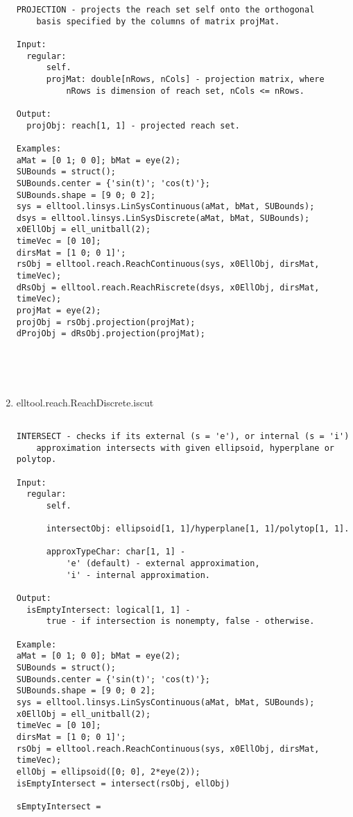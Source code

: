 \begin{enumerate}
\begin{lstlisting}
PROJECTION - projects the reach set self onto the orthogonal
    basis specified by the columns of matrix projMat.

Input:
  regular:
      self.
      projMat: double[nRows, nCols] - projection matrix, where
          nRows is dimension of reach set, nCols <= nRows.

Output:
  projObj: reach[1, 1] - projected reach set.

Examples:
aMat = [0 1; 0 0]; bMat = eye(2);
SUBounds = struct();
SUBounds.center = {'sin(t)'; 'cos(t)'};
SUBounds.shape = [9 0; 0 2];
sys = elltool.linsys.LinSysContinuous(aMat, bMat, SUBounds);
dsys = elltool.linsys.LinSysDiscrete(aMat, bMat, SUBounds);
x0EllObj = ell_unitball(2);
timeVec = [0 10];
dirsMat = [1 0; 0 1]';
rsObj = elltool.reach.ReachContinuous(sys, x0EllObj, dirsMat, timeVec);
dRsObj = elltool.reach.ReachRiscrete(dsys, x0EllObj, dirsMat, timeVec);
projMat = eye(2);
projObj = rsObj.projection(projMat);
dProjObj = dRsObj.projection(projMat);





\end{lstlisting}
\fontfamily{\familydefault}
\selectfont
\item {elltool.reach.ReachDiscrete.iscut}
\selectfont
\begin{lstlisting}

INTERSECT - checks if its external (s = 'e'), or internal (s = 'i')
    approximation intersects with given ellipsoid, hyperplane or polytop.

Input:
  regular:
      self.

      intersectObj: ellipsoid[1, 1]/hyperplane[1, 1]/polytop[1, 1].

      approxTypeChar: char[1, 1] -
          'e' (default) - external approximation,
          'i' - internal approximation.

Output:
  isEmptyIntersect: logical[1, 1] -
      true - if intersection is nonempty, false - otherwise.

Example:
aMat = [0 1; 0 0]; bMat = eye(2);
SUBounds = struct();
SUBounds.center = {'sin(t)'; 'cos(t)'};
SUBounds.shape = [9 0; 0 2];
sys = elltool.linsys.LinSysContinuous(aMat, bMat, SUBounds);
x0EllObj = ell_unitball(2);
timeVec = [0 10];
dirsMat = [1 0; 0 1]';
rsObj = elltool.reach.ReachContinuous(sys, x0EllObj, dirsMat, timeVec);
ellObj = ellipsoid([0; 0], 2*eye(2));
isEmptyIntersect = intersect(rsObj, ellObj)

sEmptyIntersect =


\end{lstlisting}
\end{enumerate}
